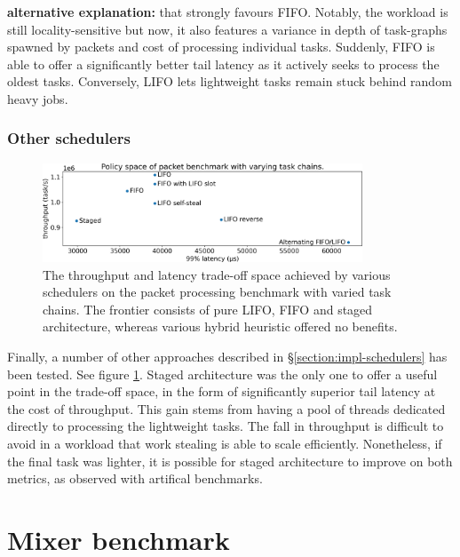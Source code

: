 \documentclass[12pt,a4paper,twoside]{report}
\begin{document}
\textbf{alternative explanation:}
that strongly favours FIFO. Notably, the workload is still locality-sensitive but now, it also features a variance in depth of task-graphs spawned by packets and cost of processing individual tasks. Suddenly, FIFO is able to offer a significantly better tail latency as it actively seeks to process the oldest tasks. Conversely, LIFO lets lightweight tasks remain stuck behind random heavy jobs. 



\subsubsection{Other schedulers}

\begin{figure} 
    \centering 
    \includegraphics[width=0.85\textwidth]{eval/packet-basic-base-hybrids.png}
    \caption{The throughput and latency trade-off space achieved by various schedulers on the packet processing benchmark with varied task chains. The frontier consists of pure LIFO, FIFO and staged architecture, whereas various hybrid heuristic offered no benefits.}
   \label{fig:packet-hybrids}
\end{figure}

Finally, a number of other approaches described in \S\ref{section:impl-schedulers} has been tested. See figure \ref{fig:packet-hybrids}. Staged architecture was the only one to offer a useful point in the trade-off space, in the form of significantly superior tail latency at the cost of throughput. This gain stems from having a pool of threads dedicated directly to processing the lightweight tasks. The fall in throughput is difficult to avoid in a workload that work stealing is able to scale efficiently. Nonetheless, if the final task was lighter, it is possible for staged architecture to improve on both metrics, as observed with artifical benchmarks. 

\section{Mixer benchmark}
\label{section:mixer-benchmark}
\end{document}
